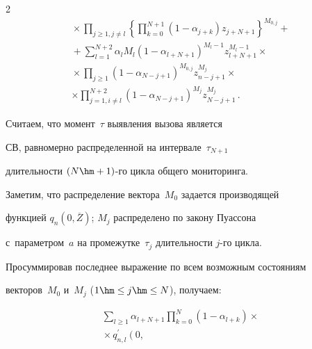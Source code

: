 \begin{multicols}{2}
\begin{multline*}
  {}\times \prod\limits_{j\geq1, j\not=l} \left\{


  \prod\limits_{k=0}^{N+1}\left( 1-\alpha_{j+k}\right) 


z_{j+N+1}\right\}^{M_{0,j}}+{}\\


{}+


 \sum\limits_{l=1}^{N+2} \alpha_l M_l\left( 1-\alpha_{l+N+1}\right)^{M_{l}-1}


  z^{M_l-1}_{l+N+1}\times{}\\


 {}\times


  \prod\limits_{j\geq1} \left(1-\alpha_{N-j+1}\right)^{M_{0,j}} 


  z^{M_j}_{n-j+1}\times{}\\


  \times 


 \prod\limits_{j=1,i\not=l}^{N+2} 


  \left( 1-\alpha_{N-j+1}\right)^{M_j} 


z^{M_j}_{N-j+1}\,.


  \end{multline*}





  Считаем, что момент~$\tau$ выявления вызова является 


СВ, равномерно распределенной на интервале~$\tau_{N+1}$ 


длительности $(N\hm+1)$-го цикла общего мониторинга.


  


  Заметим, что распределение вектора~$M_0$ задается производящей 


функцией $q_n(0,\overline{Z})$; $M_j$ распределено по закону Пуассона 


с~параметром~$a$ на промежутке~$\tau_j$ длительности $j$-го цикла. 


Просуммировав последнее выражение по всем возможным состояниям 


векторов~$M_0$ и~$M_j$ ($1\hm\leq j\hm\leq N$), получаем:


  \begin{multline*}


  \sum\limits_{l\geq1} \alpha_{l+N+1} \prod\limits^N_{k=0} \left( 1-


\alpha_{l+k}\right)\times{}\\


{}\times q^\prime_{n,l}\left( 0, 



\end{multline*}
\end{multicols}
